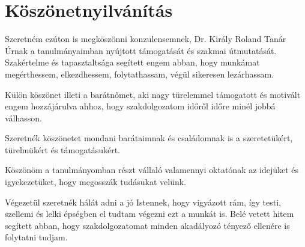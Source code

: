 \documentclass[tocnopagenum]{thesis-ekf}
\begin{document}
	\section{Köszönetnyilvánítás}
	Szeretném ezúton is megköszönni konzulensemnek, Dr. Király Roland Tanár Úrnak a tanulmányaimban nyújtott támogatását és szakmai útmutatását. Szakértelme és tapasztaltsága segített engem abban, hogy munkámat megérthessem, elkezdhessem, folytathassam, végül sikeresen lezárhassam.
	
	Külön köszönet illeti a barátnőmet, aki nagy türelemmel támogatott és motivált engem hozzájárulva ahhoz, hogy szakdolgozatom időről időre minél jobbá válhasson.
	
	Szeretnék köszönetet mondani barátaimnak és családomnak is a szeretetükért, türelmükért és támogatásukért.
	
	Köszönöm a tanulmányomban részt vállaló valamennyi oktatónak az idejüket és igyekezetüket, hogy megosszák tudásukat velünk.
	
	Végezetül szeretnék hálát adni a jó Istennek, hogy vigyázott rám, így testi, szellemi és lelki épségben el tudtam végezni ezt a munkát is. Belé vetett hitem segített abban, hogy szakdolgozatomat minden akadályozó tényező ellenére is folytatni tudjam.
	
	
	\listoffigures
	
	
\end{document}
